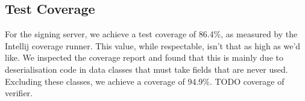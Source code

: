 \subsection{Test Coverage}\label{subsec:test-coverage}
For the signing server, we achieve a test coverage of 86.4\%,
as measured by the Intellij coverage runner.
This value, while respectable, isn't that as high as we'd like.
We inspected the coverage report and found that this is mainly due to deserialisation code in data classes that must take fields that are never used.
Excluding these classes, we achieve a coverage of 94.9\%.
TODO coverage of verifier.


